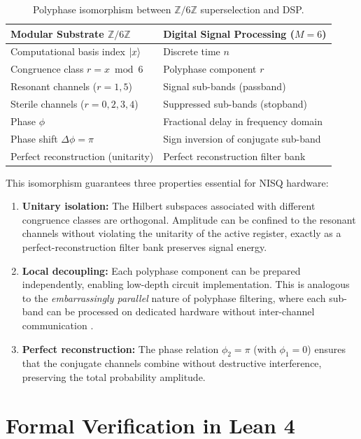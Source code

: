 \documentclass[12pt,a4paper]{article}
\theoremstyle{plain}
\theoremstyle{definition}
\theoremstyle{remark}
\begin{document}
\begin{table}[H]
\centering
\caption{Polyphase isomorphism between \(\mathbb{Z}/6\mathbb{Z}\) superselection and DSP.}
\label{tab:isomorphism}
\begin{tabular}{ll}
\toprule
\textbf{Modular Substrate \(\mathbb{Z}/6\mathbb{Z}\)} & \textbf{Digital Signal Processing (\(M=6\))} \\
\midrule
Computational basis index \(\ket{x}\) & Discrete time \(n\) \\
Congruence class \(r = x \bmod 6\) & Polyphase component \(r\) \\
Resonant channels (\(r=1,5\)) & Signal sub-bands (passband) \\
Sterile channels (\(r=0,2,3,4\)) & Suppressed sub-bands (stopband) \\
Phase \(\phi\) & Fractional delay in frequency domain \\
Phase shift \(\Delta\phi = \pi\) & Sign inversion of conjugate sub-band \\
Perfect reconstruction (unitarity) & Perfect reconstruction filter bank \\
\bottomrule
\end{tabular}
\end{table}

This isomorphism guarantees three properties essential for NISQ hardware:

\begin{enumerate}[label=(\roman*)]
    \item \textbf{Unitary isolation:} The Hilbert subspaces associated with different congruence classes are orthogonal. Amplitude can be confined to the resonant channels without violating the unitarity of the active register, exactly as a perfect-reconstruction filter bank preserves signal energy.
    \item \textbf{Local decoupling:} Each polyphase component can be prepared independently, enabling low-depth circuit implementation. This is analogous to the \textit{embarrassingly parallel} nature of polyphase filtering, where each sub-band can be processed on dedicated hardware without inter-channel communication \cite{ModularSpectrum}.
    \item \textbf{Perfect reconstruction:} The phase relation \(\phi_2 = \pi\) (with \(\phi_1 = 0\)) ensures that the conjugate channels combine without destructive interference, preserving the total probability amplitude.
\end{enumerate}

\section{Formal Verification in Lean 4}
\label{sec:lean}
\end{document}
